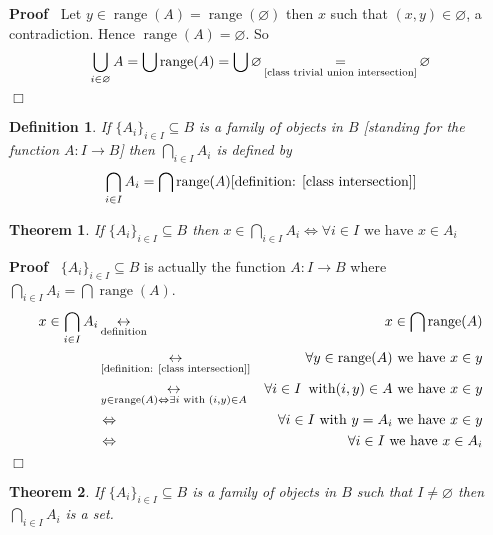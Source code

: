\documentclass{book}
\newcommand{\Leftrightarrowlim}{\mathop{\leftrightarrow}\limits}
\newcommand{\equallim}{\mathop{=}\limits}
\newcommand{\tmop}[1]{\ensuremath{\operatorname{#1}}}
\newenvironment{proof}{\noindent\textbf{Proof\ }}{\hspace*{\fill}$\Box$\medskip}
\newtheorem{definition}{Definition}
{\theorembodyfont{\rmfamily}\newtheorem{example}{Example}}
\newtheorem{theorem}{Theorem}
\begin{document}
\begin{proof}
  Let $y \in \tmop{range} (A) = \tmop{range} (\varnothing)$ then $x$ such that
  $(x, y) \in \varnothing$, a contradiction. Hence $\tmop{range} (A) =
  \varnothing$. So
  \[ \bigcup_{i \in \varnothing} A = \bigcup \tmop{range} (A) = \bigcup
     \varnothing \equallim_{\text{\ref{class trivial union intersection}}}
     \varnothing \]
\end{proof}

\begin{definition}
  \label{family intersection(1)}{}If $\{ A_i
  \}_{i \in I} \subseteq B$ is a family of objects in $B$ [standing for the
  function $A : I \rightarrow B$] then $\bigcap_{i \in I} A_i$ is defined by
  \[ \bigcap_{i \in I} A_i = \bigcap \tmop{range} (A)  \text{[definition:
     \ref{class intersection}]} \]
\end{definition}

\begin{theorem}
  \label{family intersection (2)}If $\{ A_i \}_{i \in I} \subseteq B$ then $x
  \in \bigcap_{i \in I} A_i \Leftrightarrow \forall i \in I \text{ we have } x
  \in A_i$
\end{theorem}

\begin{proof}
  $\{ A_i \}_{i \in I} \subseteq B$ is actually the function $A : I
  \rightarrow B$ where $\bigcap_{i \in I} A_i = \bigcap \tmop{range} (A)$.
  \begin{eqnarray*}
    x \in \bigcap_{i \in I} A_i & \Leftrightarrowlim_{\text{definition}} & x
    \in \bigcap \tmop{range} (A)\\
    & \Leftrightarrowlim_{\text{[definition: \ref{class intersection}]}} &
    \forall y \in \tmop{range} (A) \text{ we have } x \in y\\
    & \Leftrightarrowlim_{y \in \tmop{range} (A) \Leftrightarrow \exists i
    \text{ with } (i, y) \in A} & \forall i \in I \text{ } \tmop{with} (i, y)
    \in A \text{ we have } x \in y\\
    & \Leftrightarrow & \forall i \in I \text{ with } y = A_i \text{ we have
    } x \in y\\
    & \Leftrightarrow & \forall i \in I \text{ we have } x \in A_i
  \end{eqnarray*}
\end{proof}

\begin{theorem}
  \label{family intersection is a set}If $\{ A_i \}_{i \in I} \subseteq B$ is
  a family of objects in $B$ such that $I \neq \varnothing$ then $\bigcap_{i
  \in I} A_i$ is a set.
\end{theorem}
\end{document}
